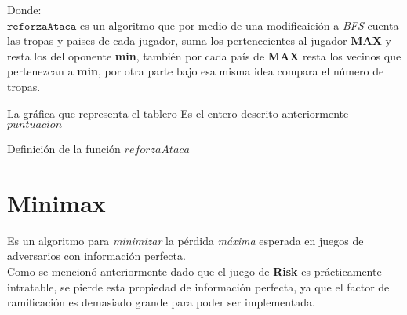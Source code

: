 \documentclass[12pt,twocolumn,draft]{article}
\begin{document}
Donde:\\

$\mathtt{reforzaAtaca}$ es un algoritmo que por medio de una modificaici\'on a \textit{BFS} cuenta
las tropas y paises de cada jugador, suma los pertenecientes al jugador \textbf{MAX} y resta los del oponente 
\textbf{min}, tambi\'en por cada pa\'is de \textbf{MAX} resta los vecinos que pertenezcan a \textbf{min}, por otra
parte bajo esa misma idea compara el n\'umero de tropas.\\



\begin{algorithm}
\begin{algorithmic}[1]
\REQUIRE La gr\'afica que representa el tablero
\ENSURE Es el entero descrito anteriormente
\ENDFOR
{}
\ENDIF
{}
\ENDIF
{}
\ENDIF
{}
\ENDIF
{}
\ENDIF
{}
\ENDIF
{}
\ENDIF
{}
\ENDIF
\ENDFOR
\ENDWHILE
\RETURN $puntuacion$
\end{algorithmic}
\caption{Definici\'on de la funci\'on $reforzaAtaca$}
\label{reforzaAtaca}
\end{algorithm}




\section{Minimax}

Es un algoritmo para \textit{minimizar} la p\'erdida \textit{m\'axima} esperada en juegos de adversarios con
informaci\'on perfecta.\\

Como se mencion\'o anteriormente dado que el juego de \textbf{Risk} es pr\'acticamente intratable, se pierde esta propiedad
de informaci\'on perfecta, ya que el factor de ramificaci\'on es demasiado grande para poder ser implementada.\\
\end{document}
